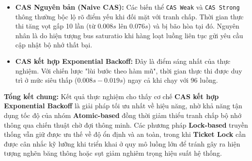 \begin{itemize}
    \item \textbf{CAS Nguyên bản (Naive CAS):} Các biến thể \texttt{CAS Weak} và \texttt{CAS Strong} thông thường bộc lộ rõ điểm yếu khi đối mặt với tranh chấp. Thời gian thực thi tăng vọt gấp 10 lần (từ $0.008s$ lên $0.076s$) và bị bão hòa tại đó. Nguyên nhân là do hiện tượng bus saturatio khi hàng loạt luồng liên tục gửi yêu cầu cập nhật bộ nhớ thất bại.
    
    \item \textbf{CAS kết hợp Exponential Backoff:} Đây là điểm sáng nhất của thực nghiệm. Với chiến lược "lùi bước theo hàm mũ", thời gian thực thi được duy trì ở mức siêu thấp ($0.008s - 0.019s$) ngay cả khi chạy với 96 luồng.

\end{itemize}




\textbf{Tổng kết chung:} Kết quả thực nghiệm cho thấy cơ chế \textbf{CAS kết hợp Exponential Backoff} là giải pháp tối ưu nhất về hiệu năng, nhờ khả năng tận dụng tốc độ của nhóm \textbf{Atomic-based} đồng thời giảm thiểu tranh chấp bộ nhớ thông qua chiến thuật chờ đợi thông minh. Các phương pháp \textbf{Lock-based} truyền thống vẫn giữ được ưu thế về độ ổn định và an toàn, trong khi \textbf{Ticket Lock} cần được cân nhắc kỹ lưỡng khi triển khai ở quy mô luồng lớn để tránh gây ra hiện tượng nghẽn băng thông hoặc sụt giảm nghiêm trọng hiệu suất hệ thống.
